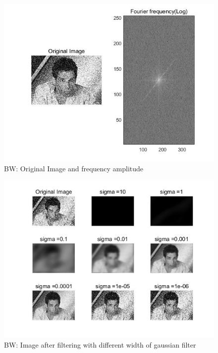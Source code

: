 \documentclass[12pt,letterpaper]{article}
\begin{document}
\begin{figure}[h]
	\caption{BW: Original Image and frequency amplitude}
	\centering
	\includegraphics[width=1\textwidth]{Part1BW1}
\end{figure}

\begin{figure}[h]
	\caption{BW: Image after filtering with different width of gaussian filter}
	\centering
	\includegraphics[width=1.4\textwidth]{Part1BW2}
\end{figure}
\end{document}
